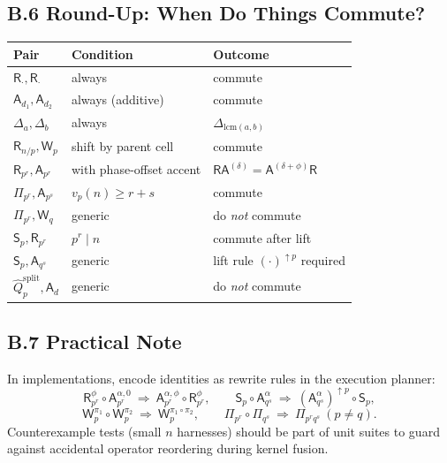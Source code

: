 \documentclass[12pt]{article}
\numberwithin{equation}{section}
\theoremstyle{plain}
\theoremstyle{definition}
\theoremstyle{remark}
\begin{document}
\subsection*{B.6 Round-Up: When Do Things Commute?}
\begin{center}
\begin{tabular}{lll}
\hline
Pair & Condition & Outcome \\
\hline
$\mathsf{R}_{\cdot},\mathsf{R}_{\cdot}$ & always & commute \\
$\mathsf{A}_{d_1},\mathsf{A}_{d_2}$ & always (additive) & commute \\
$\Delta_{a},\Delta_{b}$ & always & $\Delta_{\mathrm{lcm}(a,b)}$ \\
$\mathsf{R}_{n/p},\mathsf{W}_p$ & shift by parent cell & commute \\
$\mathsf{R}_{p^r},\mathsf{A}_{p^r}$ & with phase-offset accent & $\mathsf{R}\mathsf{A}^{(\delta)}=\mathsf{A}^{(\delta+\phi)}\mathsf{R}$ \\
$\Pi_{p^r},\mathsf{A}_{p^s}$ & $v_p(n)\ge r+s$ & commute \\
$\Pi_{p^r},\mathsf{W}_q$ & generic & do \emph{not} commute \\
$\mathsf{S}_p,\mathsf{R}_{p^r}$ & $p^r\mid n$ & commute after lift \\
$\mathsf{S}_p,\mathsf{A}_{q^s}$ & generic & lift rule $(\cdot)^{\uparrow p}$ required \\
$\hat{Q}_p^{\mathrm{split}},\mathsf{A}_d$ & generic & do \emph{not} commute \\
\hline
\end{tabular}
\end{center}

\subsection*{B.7 Practical Note}
In implementations, encode identities as rewrite rules in the execution planner:
\[
\mathsf{R}_{p^r}^{\phi}\circ \mathsf{A}_{p^r}^{\alpha,0}\ \Rightarrow\ \mathsf{A}_{p^r}^{\alpha,\phi}\circ \mathsf{R}_{p^r}^{\phi},\qquad
\mathsf{S}_p\circ \mathsf{A}_{q^s}^{\alpha}\ \Rightarrow\ (\mathsf{A}_{q^s}^{\alpha})^{\uparrow p}\circ \mathsf{S}_p,
\]
\[
\mathsf{W}_p^{\pi_1}\circ \mathsf{W}_p^{\pi_2}\ \Rightarrow\ \mathsf{W}_p^{\pi_1\circ \pi_2},
\qquad
\Pi_{p^r}\circ \Pi_{q^s}\ \Rightarrow\ \Pi_{p^rq^s}\ (p\neq q).
\]
Counterexample tests (small $n$ harnesses) should be part of unit suites to guard against accidental operator reordering during kernel fusion.
\end{document}
